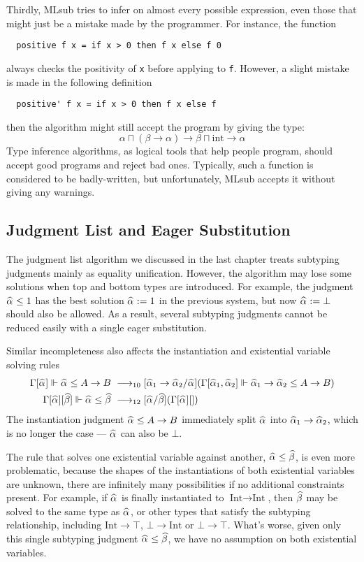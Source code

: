 Thirdly, MLsub tries to infer on almost every possible expression,
even those that might just be a mistake made by the programmer.
For instance, the function
\begin{verbatim}
  positive f x = if x > 0 then f x else f 0
\end{verbatim}
always checks the positivity of \verb|x| before applying to \verb|f|.
However, a slight mistake is made in the following definition
\begin{verbatim}
  positive' f x = if x > 0 then f x else f
\end{verbatim}
then the algorithm might still accept the program by giving the type:
$$\alpha \sqcap (\beta \to \alpha) \to \beta \sqcap \text{int} \to \alpha$$
Type inference algorithms, as logical tools that help people program,
should accept good programs and reject bad ones.
Typically, such a function is considered to be badly-written,
but unfortunately, MLsub accepts it without giving any warnings.

\subsection{Judgment List and Eager Substitution}

The judgment list algorithm we discussed in the last chapter treats subtyping
judgments mainly as equality unification.
However, the algorithm may lose some solutions
when top and bottom types are introduced.
For example,
the judgment $\al \le 1$ has the best solution
$\al := 1$ in the previous system,
but now $\al := \bot$ should also be allowed.
As a result, several subtyping judgments cannot be reduced easily with a single
eager substitution.

Similar incompleteness also affects the instantiation and
existential variable solving rules
\begin{gather*}
\begin{aligned}
    \Gm[\al] \Vdash \al \le A\to B &\rrule{10} [\al[1]\to\al[2]/\al] (\Gm[\al[1], \al[2]] \Vdash \al[1]\to \al[2] \le A \to B)\\
    \Gm[\al][\bt] \Vdash \al \le \bt &\rrule{12} [\al/\bt](\Gm[\al][])
\end{aligned}
\end{gather*}
The instantiation judgment $\al \le A \to B$ immediately split $\al$ into $\al[1] \to \al[2]$,
which is no longer the case --- $\al$ can also be $\bot$.

The rule that solves one existential variable against another,
$\al \le \bt$, is even more problematic,
because the shapes of the instantiations of both existential variables are unknown,
there are infinitely many possibilities if no additional constraints present.
For example, if $\al$ is finally instantiated to $\text{Int} \to \text{Int}$,
then $\bt$ may be solved to the same type as $\al$,
or other types that satisfy the subtyping relationship,
including $\text{Int} \to \top$, $\bot \to \text{Int}$ or $\bot \to \top$.
What's worse, given only this single subtyping judgment $\al \le \bt$,
we have no assumption on both existential variables.


